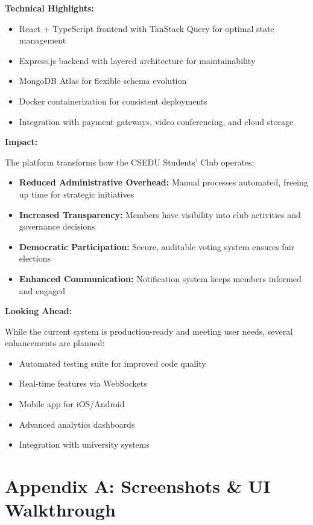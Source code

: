 \documentclass[12pt,a4paper]{article}
\begin{document}
\textbf{Technical Highlights:}

\begin{itemize}[noitemsep]
  \item React + TypeScript frontend with TanStack Query for optimal state management
  \item Express.js backend with layered architecture for maintainability
  \item MongoDB Atlas for flexible schema evolution
  \item Docker containerization for consistent deployments
  \item Integration with payment gateways, video conferencing, and cloud storage
\end{itemize}

\textbf{Impact:}

The platform transforms how the CSEDU Students' Club operates:
\begin{itemize}[noitemsep]
  \item \textbf{Reduced Administrative Overhead:} Manual processes automated, freeing up time for strategic initiatives
  \item \textbf{Increased Transparency:} Members have visibility into club activities and governance decisions
  \item \textbf{Democratic Participation:} Secure, auditable voting system ensures fair elections
  \item \textbf{Enhanced Communication:} Notification system keeps members informed and engaged
\end{itemize}

\textbf{Looking Ahead:}

While the current system is production-ready and meeting user needs, several enhancements are planned:
\begin{itemize}[noitemsep]
  \item Automated testing suite for improved code quality
  \item Real-time features via WebSockets
  \item Mobile app for iOS/Android
  \item Advanced analytics dashboards
  \item Integration with university systems
\end{itemize}

\section*{Appendix A: Screenshots \& UI Walkthrough}
\end{document}
